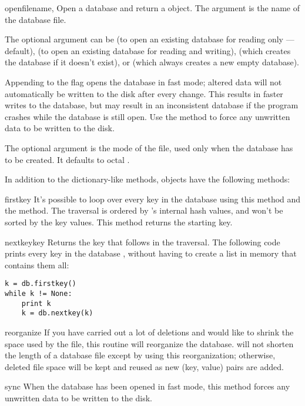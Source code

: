 \begin{funcdesc}{open}{filename, }
Open a  database and return a  object.  The
 argument is the name of the database file.

The optional  argument can be
 (to open an existing database for reading only --- default),
 (to open an existing database for reading and writing),
 (which creates the database if it doesn't exist), or
 (which always creates a new empty database).

Appending  to the flag opens the database in fast mode;
altered data will not automatically be written to the disk after every
change.  This results in faster writes to the database, but may result
in an inconsistent database if the program crashes while the database
is still open.  Use the  method to force any unwritten
data to be written to the disk.

The optional  argument is the \UNIX{} mode of the file, used
only when the database has to be created.  It defaults to octal
.
\end{funcdesc}

In addition to the dictionary-like methods,  objects have the
following methods:

\begin{funcdesc}{firstkey}{}
It's possible to loop over every key in the database using this method 
and the  method.  The traversal is ordered by
's internal hash values, and won't be sorted by the key
values.  This method returns the starting key.
\end{funcdesc}

\begin{funcdesc}{nextkey}{key}
Returns the key that follows  in the traversal.  The
following code prints every key in the database , without
having to create a list in memory that contains them all:

\begin{verbatim}
k = db.firstkey()
while k != None:
    print k
    k = db.nextkey(k)
\end{verbatim}
\end{funcdesc}

\begin{funcdesc}{reorganize}{}
If you have carried out a lot of deletions and would like to shrink
the space used by the  file, this routine will reorganize
the database.   will not shorten the length of a database
file except by using this reorganization; otherwise, deleted file
space will be kept and reused as new (key, value) pairs are added.
\end{funcdesc}

\begin{funcdesc}{sync}{}
When the database has been opened in fast mode, this method forces any 
unwritten data to be written to the disk.
\end{funcdesc}

